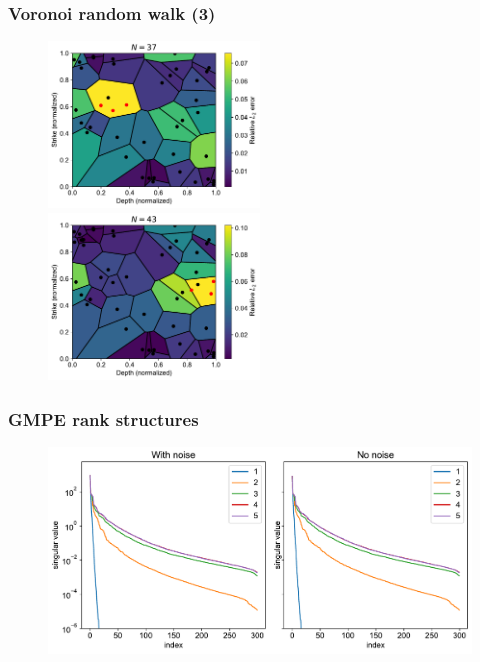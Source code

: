 \documentclass{beamer}
\begin{document}
    \begin{frame}
        \frametitle{Voronoi random walk (3)}
        \begin{figure}
            \includegraphics[width=0.5\textwidth]{figs/vor_random_1.pdf}%
            \includegraphics[width=0.5\textwidth]{figs/vor_random_2.pdf}
        \end{figure}
    \end{frame}
    \begin{frame}
        \frametitle{GMPE rank structures}
        \begin{figure}
            \includegraphics[width=\textwidth]{figs/rank_structures_gmpe.pdf}
        \end{figure}
    \end{frame}
\end{document}
